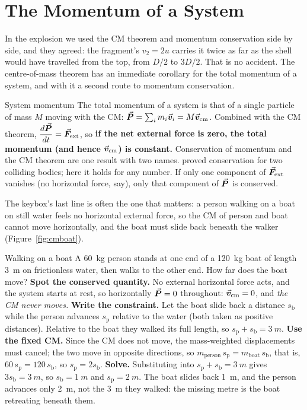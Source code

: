 \section{The Momentum of a System}

In the explosion we used the CM theorem and momentum conservation side by side, and they agreed: the
fragment's $v_2=2u$ carries it twice as far as the shell would have travelled from the top, from $D/2$ to $3D/2$. That is no accident. The centre-of-mass theorem has an immediate corollary for the total
momentum of a system, and with it a second route to momentum conservation.

\begin{keybox}{System momentum}
The total momentum of a system is that of a single particle of mass $M$ moving with the CM:
$\vec{\bm{P}}=\sum_i m_i\vec{\bm{v}}_i=M\vec{\bm{v}}_{\text{cm}}$. Combined with the CM theorem, $\dfrac{d\vec{\bm{P}}}{dt}=\vec{\bm{F}}_{\text{ext}}$,
so \textbf{if the net external force is zero, the total momentum (and hence $\vec{\bm{v}}_{\text{cm}}$) is
constant.} Conservation of momentum and the CM theorem are one result with two names. 
proved conservation for two colliding bodies; here it holds for any number. If only one component of
$\vec{\bm{F}}_{\text{ext}}$ vanishes (no horizontal force, say), only that component of $\vec{\bm{P}}$ is conserved.
\end{keybox}

The keybox's last line is often the one that matters: a person walking on a boat on still water feels no
horizontal external force, so the CM of person and boat cannot move horizontally, and the boat must slide
back beneath the walker (Figure~\ref{fig:cmboat}).

\begin{exbox}{Walking on a boat}
A \SI{60}{kg} person stands at one end of a \SI{120}{kg} boat of length \SI{3}{m} on frictionless water,
then walks to the other end. How far does the boat move?
 \textbf{Spot the conserved quantity.} No external horizontal force acts, and the system starts
at rest, so horizontally $\vec{\bm{P}}=0$ throughout: $\vec{\bm{v}}_{\text{cm}}=0$, and \emph{the CM never moves.}
 \textbf{Write the constraint.} Let the boat slide back a distance $s_{\text{b}}$ while the person advances
$s_{\text{p}}$ relative to the water (both taken as positive distances). Relative to the boat they walked its full length, so
$s_{\text{p}}+s_{\text{b}}=\SI{3}{m}$.
 \textbf{Use the fixed CM.} Since the CM does not move, the mass-weighted displacements must
cancel; the two move in opposite directions, so $m_{\text{person}}\,s_{\text{p}}=m_{\text{boat}}\,s_{\text{b}}$, that is, $60\,s_{\text{p}}=120\,s_{\text{b}}$,
so $s_{\text{p}}=2s_{\text{b}}$.
 \textbf{Solve.} Substituting into $s_{\text{p}}+s_{\text{b}}=\SI{3}{m}$ gives $3s_{\text{b}}=\SI{3}{m}$, so
$s_{\text{b}}=\SI{1}{m}$ and $s_{\text{p}}=\SI{2}{m}$. The
boat slides back \SI{1}{m}, and the person advances only \SI{2}{m}, not the \SI{3}{m} they walked: the
missing metre is the boat retreating beneath them. 
\end{exbox}

